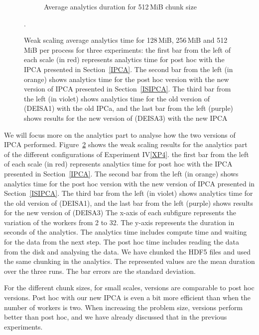 \begin{figure}
\begin{subfigure}[b]{0.3\textwidth}
         \caption{Average analytics duration for 512\,MiB chunk size}
         \label{fig:A512_1_3_p}
     \end{subfigure}
        \caption{Weak scaling average analytics time for 128\,MiB, 256\,MiB and 512\,MiB per process for three experiments: the first bar from the left of each scale (in red) represents analytics time for post hoc with the IPCA presented in Section~\ref{IPCA}. The second bar from the left (in orange) shows analytics time for the post hoc version with the new version of IPCA presented in Section~\ref{ISIPCA}. The third bar from the left (in violet) shows analytics time for the old version of \deisa (DEISA1) with the old IPCa, and the last bar from the left (purple) shows results for the new version of \deisa (DEISA3) with the new IPCA}. 
        \label{fig:perfA3}
\end{figure}

We will focus more on the analytics part to analyse how the two versions of IPCA performed. Figure~\ref{fig:perfA3} shows the weak scaling results for the analytics part of the different configurations of Experiment IV\ref{XP4}.
the first bar from the left of each scale (in red) represents analytics time for post hoc with the IPCA presented in Section~\ref{IPCA}. 
The second bar from the left (in orange) shows analytics time for the post hoc version with the new version of IPCA presented in Section~\ref{ISIPCA}. 
The third bar from the left (in violet) shows analytics time for the old version of \deisa (DEISA1), and the last bar from the left (purple) shows results for the new version of \deisa (DEISA3)
The x-axis of each subfigure represents the variation of the \dask workers from 2 to 32. The y-axis represents the duration in seconds of the analytics. 
The \deisa analytics time includes compute time and waiting for the data from the next step. The post hoc time includes reading the data from the disk and analysing the data. We have chunked the HDF5 files and used the same chunking in the analytics.
The represented values are the mean duration over the three runs. The bar errors are the standard deviation.      

For the different chunk sizes, for small scales, \deisa versions are comparable to post hoc versions. Post hoc with our new IPCA is even a bit more efficient than \deisa when the number of \dask workers is two. When increasing the problem size, \deisa versions perform better than post hoc, and we have already discussed that in the previous experiments. 

